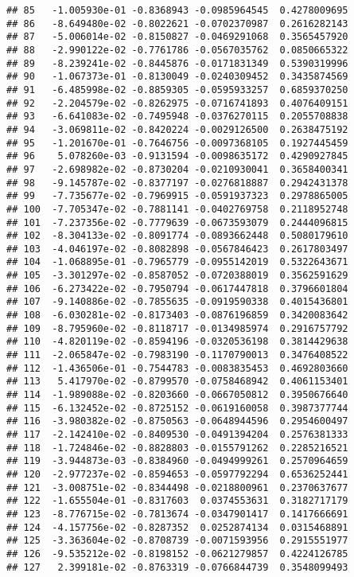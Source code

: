 \documentclass[
]{article}
\begin{document}
\begin{verbatim}
## 85   -1.005930e-01 -0.8368943 -0.0985964545  0.4278009695
## 86   -8.649480e-02 -0.8022621 -0.0702370987  0.2616282143
## 87   -5.006014e-02 -0.8150827 -0.0469291068  0.3565457920
## 88   -2.990122e-02 -0.7761786 -0.0567035762  0.0850665322
## 89   -8.239241e-02 -0.8445876 -0.0171831349  0.5390319996
## 90   -1.067373e-01 -0.8130049 -0.0240309452  0.3435874569
## 91   -6.485998e-02 -0.8859305 -0.0595933257  0.6859370250
## 92   -2.204579e-02 -0.8262975 -0.0716741893  0.4076409151
## 93   -6.641083e-02 -0.7495948 -0.0376270115  0.2055708838
## 94   -3.069811e-02 -0.8420224 -0.0029126500  0.2638475192
## 95   -1.201670e-01 -0.7646756 -0.0097368105  0.1927445459
## 96    5.078260e-03 -0.9131594 -0.0098635172  0.4290927845
## 97   -2.698982e-02 -0.8730204 -0.0210930041  0.3658400341
## 98   -9.145787e-02 -0.8377197 -0.0276818887  0.2942431378
## 99   -7.735677e-02 -0.7969915 -0.0591937323  0.2978865005
## 100  -7.705347e-02 -0.7881141 -0.0402769758  0.2118952748
## 101  -7.237356e-02 -0.7779639 -0.0673593079  0.2444096815
## 102  -8.304133e-02 -0.8091774 -0.0893662448  0.5080179610
## 103  -4.046197e-02 -0.8082898 -0.0567846423  0.2617803497
## 104  -1.068895e-01 -0.7965779 -0.0955142019  0.5322643671
## 105  -3.301297e-02 -0.8587052 -0.0720388019  0.3562591629
## 106  -6.273422e-02 -0.7950794 -0.0617447818  0.3796601804
## 107  -9.140886e-02 -0.7855635 -0.0919590338  0.4015436801
## 108  -6.030281e-02 -0.8173403 -0.0876196859  0.3420083642
## 109  -8.795960e-02 -0.8118717 -0.0134985974  0.2916757792
## 110  -4.820119e-02 -0.8594196 -0.0320536198  0.3814429638
## 111  -2.065847e-02 -0.7983190 -0.1170790013  0.3476408522
## 112  -1.436506e-01 -0.7544783 -0.0083835453  0.4692803660
## 113   5.417970e-02 -0.8799570 -0.0758468942  0.4061153401
## 114  -1.989088e-02 -0.8203660 -0.0667050812  0.3950676640
## 115  -6.132452e-02 -0.8725152 -0.0619160058  0.3987377744
## 116  -3.980382e-02 -0.8750563 -0.0648944596  0.2954600497
## 117  -2.142410e-02 -0.8409530 -0.0491394204  0.2576381333
## 118  -1.724846e-02 -0.8828803 -0.0155791262  0.2285216521
## 119  -3.944873e-03 -0.8384960 -0.0494999261  0.2570964659
## 120  -2.977237e-02 -0.8594653 -0.0597792294  0.6536252441
## 121  -3.008751e-02 -0.8344498 -0.0218800961  0.2370637677
## 122  -1.655504e-01 -0.8317603  0.0374553631  0.3182717179
## 123  -8.776715e-02 -0.7813674 -0.0347901417  0.1417666691
## 124  -4.157756e-02 -0.8287352  0.0252874134  0.0315468891
## 125  -3.363604e-02 -0.8708739 -0.0071593956  0.2915551977
## 126  -9.535212e-02 -0.8198152 -0.0621279857  0.4224126785
## 127   2.399181e-02 -0.8763319 -0.0766844739  0.3548099493

\end{verbatim}
\end{document}
